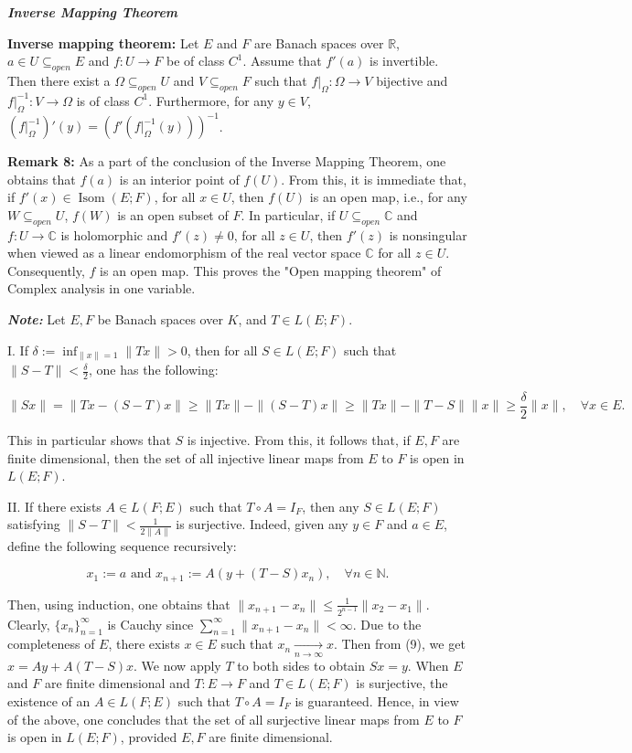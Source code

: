 \documentclass{book}
\begin{document}
\newpage
\begin{center}
    \textbf{\textit{Inverse Mapping Theorem}}
\end{center}

\textbf{Inverse mapping theorem:} Let $E$ and $F$ are Banach spaces over $\mathbb{R}$, $a \in U \subseteq_{open} E$ and $f : U \to F$ be of class $C^1$. Assume that $f'(a)$ is invertible. Then there exist a $\Omega \subseteq_{open} U$ and $V \subseteq_{open} F$ such that $f|_{\Omega} : \Omega \to V$ bijective and $f|_{\Omega}^{-1} : V \to \Omega$ is of class $C^1$. Furthermore, for any $y \in V$, $(f|_{\Omega}^{-1})'(y) = (f'(f|_{\Omega}^{-1}(y)))^{-1}$.

\textbf{Remark 8:} As a part of the conclusion of the Inverse Mapping Theorem, one obtains that $f(a)$ is an interior point of $f(U)$. From this, it is immediate that, if $f'(x) \in \operatorname{Isom}(E; F)$, for all $x \in U$, then $f(U)$ is an open map, i.e., for any $W \subseteq_{open} U$, $f(W)$ is an open subset of $F$. In particular, if $U \subseteq_{open} \mathbb{C}$ and $f : U \to \mathbb{C}$ is holomorphic and $f'(z) \neq 0$, for all $z \in U$, then $f'(z)$ is nonsingular when viewed as a linear endomorphism of the real vector space $\mathbb{C}$ for all $z \in U$. Consequently, $f$ is an open map. This proves the "Open mapping theorem" of Complex analysis in one variable.

\textit{\textbf{Note:}} Let $E, F$ be Banach spaces over $K$, and $T \in L(E; F)$.

I. If $\delta := \inf_{\|x\|=1} \|Tx\| > 0$, then for all $S \in L(E; F)$ such that $\|S - T\| < \frac{\delta}{2}$, one has the following:

\[
\|Sx\| = \|Tx - (S - T)x\| \geq \|Tx\| - \|(S - T)x\| \geq \|Tx\| - \|T - S\|\|x\| \geq \frac{\delta}{2}\|x\|, \quad \forall x \in E.
\]

This in particular shows that $S$ is injective. From this, it follows that, if $E, F$ are finite dimensional, then the set of all injective linear maps from $E$ to $F$ is open in $L(E; F)$.

II. If there exists $A \in L(F; E)$ such that $T \circ A = I_F$, then any $S \in L(E; F)$ satisfying $\|S - T\| < \frac{1}{2\|A\|}$ is surjective. Indeed, given any $y \in F$ and $a \in E$, define the following sequence recursively:

\[
x_1 := a \text{ and } x_{n+1} := A(y + (T - S)x_n), \quad \forall n \in \mathbb{N}.
\tag{9}
\]

Then, using induction, one obtains that $\|x_{n+1} - x_n\| \leq \frac{1}{2^{n-1}} \|x_2 - x_1\|$. Clearly, $\{x_n\}_{n=1}^{\infty}$ is Cauchy since $\sum_{n=1}^{\infty} \|x_{n+1} - x_n\| < \infty$. Due to the completeness of $E$, there exists $x \in E$ such that $x_n \xrightarrow[n \to \infty]{} x$. Then from (9), we get $x = Ay + A(T - S)x$. We now apply $T$ to both sides to obtain $Sx = y$. When $E$ and $F$ are finite dimensional and $T : E \to F$ and $T \in L(E; F)$ is surjective, the existence of an $A \in L(F; E)$ such that $T \circ A = I_F$ is guaranteed. Hence, in view of the above, one concludes that the set of all surjective linear maps from $E$ to $F$ is open in $L(E; F)$, provided $E, F$ are finite dimensional.
\end{document}
